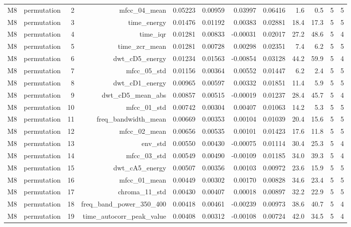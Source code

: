 \begin{table}[htbp]
\begin{tabular}{lrrrrrrrrrrr}
    M8 & permutation & 2 & mfcc\_04\_mean & 0.05223 & 0.00959 & 0.03997 & 0.06416 & 1.6 & 0.5 & 5 & 5 \\
    M8 & permutation & 3 & time\_energy & 0.01476 & 0.01192 & 0.00383 & 0.02881 & 18.4 & 17.3 & 5 & 5 \\
    M8 & permutation & 4 & time\_iqr & 0.01281 & 0.00833 & -0.00031 & 0.02017 & 27.2 & 48.6 & 5 & 4 \\
    M8 & permutation & 5 & time\_zcr\_mean & 0.01281 & 0.00728 & 0.00298 & 0.02351 & 7.4 & 6.2 & 5 & 5 \\
    M8 & permutation & 6 & dwt\_cD5\_energy & 0.01234 & 0.01563 & -0.00854 & 0.03128 & 44.2 & 59.9 & 5 & 4 \\
    M8 & permutation & 7 & mfcc\_05\_std & 0.01156 & 0.00364 & 0.00552 & 0.01447 & 6.2 & 2.4 & 5 & 5 \\
    M8 & permutation & 8 & dwt\_cD1\_energy & 0.00965 & 0.00597 & 0.00332 & 0.01851 & 11.4 & 5.9 & 5 & 5 \\
    M8 & permutation & 9 & dwt\_cD5\_mean\_abs & 0.00857 & 0.00515 & -0.00019 & 0.01237 & 28.4 & 45.7 & 5 & 4 \\
    M8 & permutation & 10 & mfcc\_01\_std & 0.00742 & 0.00304 & 0.00407 & 0.01063 & 14.2 & 5.3 & 5 & 5 \\
    M8 & permutation & 11 & freq\_bandwidth\_mean & 0.00669 & 0.00353 & 0.00104 & 0.01039 & 20.4 & 15.6 & 5 & 5 \\
    M8 & permutation & 12 & mfcc\_02\_mean & 0.00656 & 0.00535 & 0.00101 & 0.01423 & 17.6 & 11.8 & 5 & 5 \\
    M8 & permutation & 13 & env\_std & 0.00550 & 0.00430 & -0.00075 & 0.01114 & 30.4 & 25.3 & 5 & 4 \\
    M8 & permutation & 14 & mfcc\_03\_std & 0.00549 & 0.00490 & -0.00109 & 0.01185 & 34.0 & 39.3 & 5 & 4 \\
    M8 & permutation & 15 & dwt\_cA5\_energy & 0.00507 & 0.00356 & 0.00103 & 0.00972 & 23.6 & 15.9 & 5 & 5 \\
    M8 & permutation & 16 & mfcc\_01\_mean & 0.00449 & 0.00302 & 0.00170 & 0.00828 & 34.6 & 23.4 & 5 & 5 \\
    M8 & permutation & 17 & chroma\_11\_std & 0.00430 & 0.00407 & 0.00018 & 0.00897 & 32.2 & 22.9 & 5 & 5 \\
    M8 & permutation & 18 & freq\_band\_power\_350\_400 & 0.00418 & 0.00461 & -0.00239 & 0.00973 & 38.6 & 40.7 & 5 & 4 \\
    M8 & permutation & 19 & time\_autocorr\_peak\_value & 0.00408 & 0.00312 & -0.00108 & 0.00724 & 42.0 & 34.5 & 5 & 4 \\

\end{tabular}
\end{table}
